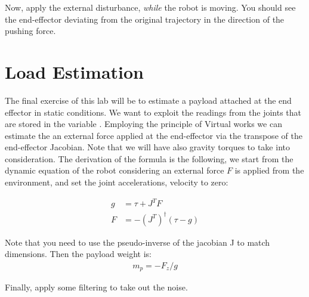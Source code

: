 \documentclass[11pt]{article}
\begin{document}
Now, apply the external disturbance, \textit{while} the robot is moving. You should see the end-effector deviating from the original trajectory in the direction of the pushing force. 
 



\section{Load Estimation}
The final exercise of this lab will be to estimate a payload attached at the end effector in static conditions. We want to exploit the readings from the  joints that are stored in the variable . Employing the principle of Virtual works we can estimate the an external force applied at the end-effector via the transpose of the end-effector Jacobian. Note that we will have also gravity torques to take into consideration.
The derivation of the formula is the following, we start from the dynamic equation of the robot considering an external force $F$ is applied from the environment, and set the joint accelerations, velocity to zero:

\begin{align*}
g &= \tau  + J^TF \\
F &= -(J^T)^\dagger (\tau - g) 
\end{align*}

Note that you need to use the pseudo-inverse of the jacobian J to match dimensions.  Then the payload weight is:
\begin{align*}
m_p = -F_z / g 
\end{align*}

Finally, apply some filtering to take out the noise. 
\end{document}
